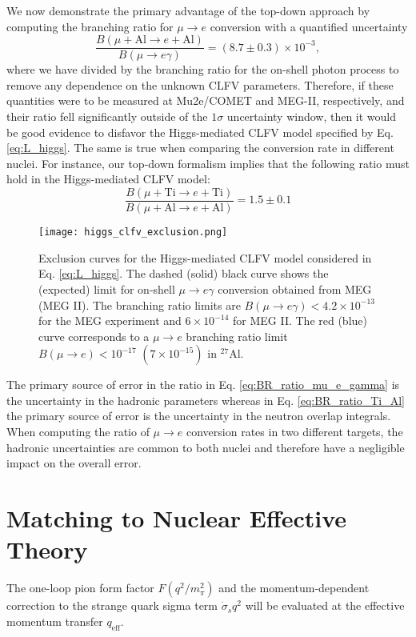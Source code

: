 \documentclass{book}[letterpaper,12pt]
\begin{document}
We now demonstrate the primary advantage of the top-down approach by computing the branching ratio for $\mu\rightarrow e$ conversion with a quantified uncertainty 
\begin{equation}
\frac{B\left(\mu+\mathrm{Al}\rightarrow e+\mathrm{Al}\right)}{B\left(\mu\rightarrow e\gamma\right)}=\left(8.7\pm 0.3\right)\times 10^{-3},
\label{eq:BR_ratio_mu_e_gamma}
\end{equation}
where we have divided by the branching ratio for the on-shell photon process to remove any dependence on the unknown CLFV parameters. Therefore, if these quantities were to be measured at Mu2e/COMET and MEG-II, respectively, and their ratio fell significantly outside of the $1\sigma$ uncertainty window, then it would be good evidence to disfavor the Higgs-mediated CLFV model specified by Eq. \ref{eq:L_higgs}. The same is true when comparing the conversion rate in different nuclei. For instance, our top-down formalism implies that the following ratio must hold in the Higgs-mediated CLFV model:
\begin{equation}
\frac{B\left(\mu+\mathrm{Ti}\rightarrow e+\mathrm{Ti}\right)}{B\left(\mu+\mathrm{Al}\rightarrow e+\mathrm{Al}\right)}=1.5\pm 0.1
\label{eq:BR_ratio_Ti_Al}
\end{equation}
\begin{figure}
\centering
\texttt{[image: higgs\_clfv\_exclusion.png]}
\caption{Exclusion curves for the Higgs-mediated CLFV model considered in Eq. \ref{eq:L_higgs}. The dashed (solid) black curve shows the (expected) limit for on-shell $\mu\rightarrow e\gamma$ conversion obtained from MEG (MEG II). The branching ratio limits are $B(\mu\rightarrow e\gamma)<4.2\times 10^{-13}$ for the MEG experiment and $6\times 10^{-14}$ for MEG II. The red (blue) curve corresponds to a $\mu\rightarrow e$ branching ratio limit $B(\mu\rightarrow e)<10^{-17}$ $(7\times 10^{-15})$ in $^{27}$Al.}
\label{fig:higgs_clfv_exclusion}
\end{figure}
The primary source of error in the ratio in Eq. \ref{eq:BR_ratio_mu_e_gamma} is the uncertainty in the hadronic parameters whereas in Eq. \ref{eq:BR_ratio_Ti_Al} the primary source of error is the uncertainty in the neutron overlap integrals. When computing the ratio of $\mu\rightarrow e$ conversion rates in two different targets, the hadronic uncertainties are common to both nuclei and therefore have a negligible impact on the overall error.
\section{Matching to Nuclear Effective Theory}
The one-loop pion form factor $F(q^2/m_{\pi}^2)$ and the momentum-dependent correction to the strange quark sigma term $\dot{\sigma}_sq^2$ will be evaluated at the effective momentum transfer $q_\mathrm{eff}$.
\end{document}
